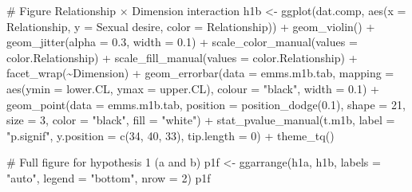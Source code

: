 \documentclass[
  bookmarksnumbered]{article}
\newenvironment{Shaded}{\begin{snugshade}}{\end{snugshade}}
\newcommand{\AttributeTok}[1]{\textcolor[rgb]{0.80,0.80,0.80}{#1}}
\newcommand{\CommentTok}[1]{\textcolor[rgb]{0.50,0.62,0.50}{#1}}
\newcommand{\DecValTok}[1]{\textcolor[rgb]{0.86,0.86,0.80}{#1}}
\newcommand{\FloatTok}[1]{\textcolor[rgb]{0.75,0.75,0.82}{#1}}
\newcommand{\FunctionTok}[1]{\textcolor[rgb]{0.94,0.94,0.56}{#1}}
\newcommand{\NormalTok}[1]{\textcolor[rgb]{0.80,0.80,0.80}{#1}}
\newcommand{\OtherTok}[1]{\textcolor[rgb]{0.94,0.94,0.56}{#1}}
\newcommand{\SpecialCharTok}[1]{\textcolor[rgb]{0.86,0.64,0.64}{#1}}
\newcommand{\StringTok}[1]{\textcolor[rgb]{0.80,0.58,0.58}{#1}}
\begin{document}
\begin{Shaded}
\begin{Highlighting}[]
\CommentTok{\# Figure Relationship × Dimension interaction}
\NormalTok{h1b }\OtherTok{\textless{}{-}} \FunctionTok{ggplot}\NormalTok{(dat.comp, }\FunctionTok{aes}\NormalTok{(}\AttributeTok{x =}\NormalTok{ Relationship, }\AttributeTok{y =} \StringTok{\textasciigrave{}}\AttributeTok{Sexual desire}\StringTok{\textasciigrave{}}\NormalTok{, }\AttributeTok{color =}\NormalTok{ Relationship)) }\SpecialCharTok{+}
  \FunctionTok{geom\_violin}\NormalTok{() }\SpecialCharTok{+}
  \FunctionTok{geom\_jitter}\NormalTok{(}\AttributeTok{alpha =} \FloatTok{0.3}\NormalTok{, }\AttributeTok{width =} \FloatTok{0.1}\NormalTok{) }\SpecialCharTok{+}
  \FunctionTok{scale\_color\_manual}\NormalTok{(}\AttributeTok{values =}\NormalTok{ color.Relationship) }\SpecialCharTok{+}
  \FunctionTok{scale\_fill\_manual}\NormalTok{(}\AttributeTok{values =}\NormalTok{ color.Relationship) }\SpecialCharTok{+}
  \FunctionTok{facet\_wrap}\NormalTok{(}\SpecialCharTok{\textasciitilde{}}\NormalTok{Dimension) }\SpecialCharTok{+}
  \FunctionTok{geom\_errorbar}\NormalTok{(}\AttributeTok{data =}\NormalTok{ emms.m1b.tab, }
                \AttributeTok{mapping =} \FunctionTok{aes}\NormalTok{(}\AttributeTok{ymin =}\NormalTok{ lower.CL, }\AttributeTok{ymax =}\NormalTok{ upper.CL), }
                \AttributeTok{colour =} \StringTok{"black"}\NormalTok{, }\AttributeTok{width =} \FloatTok{0.1}\NormalTok{) }\SpecialCharTok{+}
  \FunctionTok{geom\_point}\NormalTok{(}\AttributeTok{data =}\NormalTok{ emms.m1b.tab, }
             \AttributeTok{position =} \FunctionTok{position\_dodge}\NormalTok{(}\FloatTok{0.1}\NormalTok{), }
             \AttributeTok{shape =} \DecValTok{21}\NormalTok{, }\AttributeTok{size =} \DecValTok{3}\NormalTok{,}
             \AttributeTok{color =} \StringTok{"black"}\NormalTok{, }\AttributeTok{fill =} \StringTok{"white"}\NormalTok{) }\SpecialCharTok{+}
  \FunctionTok{stat\_pvalue\_manual}\NormalTok{(t.m1b, }
                     \AttributeTok{label =} \StringTok{"p.signif"}\NormalTok{, }
                     \AttributeTok{y.position =} \FunctionTok{c}\NormalTok{(}\DecValTok{34}\NormalTok{, }\DecValTok{40}\NormalTok{, }\DecValTok{33}\NormalTok{), }
                     \AttributeTok{tip.length =} \DecValTok{0}\NormalTok{) }\SpecialCharTok{+}
  \FunctionTok{theme\_tq}\NormalTok{()}

\CommentTok{\# Full figure for hypothesis 1 (a and b)}
\NormalTok{p1f }\OtherTok{\textless{}{-}} \FunctionTok{ggarrange}\NormalTok{(h1a, h1b,}
                 \AttributeTok{labels =} \StringTok{"auto"}\NormalTok{,}
                 \AttributeTok{legend =} \StringTok{"bottom"}\NormalTok{,}
                 \AttributeTok{nrow =} \DecValTok{2}\NormalTok{)}
\NormalTok{p1f}
\end{Highlighting}
\end{Shaded}
\end{document}
